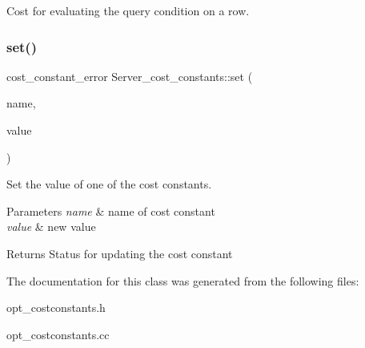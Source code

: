 Cost for evaluating the query condition on a row. \mbox{\label{classServer__cost__constants_a5dff135f3610f4f0226debac4d13eeb9}} 
\subsubsection{\texorpdfstring{set()}{set()}}
{\footnotesize\ttfamily cost\+\_\+constant\+\_\+error Server\+\_\+cost\+\_\+constants\+::set (\begin{DoxyParamCaption}\item[{const L\+E\+X\+\_\+\+C\+S\+T\+R\+I\+NG \&}]{name,  }\item[{const double}]{value }\end{DoxyParamCaption})}

Set the value of one of the cost constants.


\begin{DoxyParams}{Parameters}
{\em name} & name of cost constant \\
\hline
{\em value} & new value\\
\hline
\end{DoxyParams}
\begin{DoxyReturn}{Returns}
Status for updating the cost constant 
\end{DoxyReturn}


The documentation for this class was generated from the following files\+:\begin{DoxyCompactItemize}
\item 
opt\+\_\+costconstants.\+h\item 
opt\+\_\+costconstants.\+cc\end{DoxyCompactItemize}
